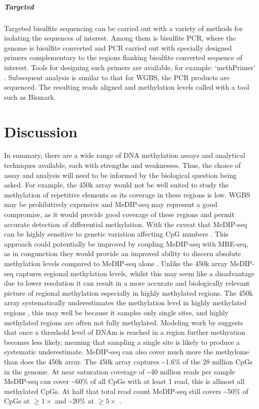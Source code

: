 \documentclass[
]{book}
\begin{document}
\hypertarget{targeted}{%
\subparagraph{Targeted}\label{targeted}}

Targeted bisulfite sequencing can be carried out with a variety of methods for isolating the sequences of interest. Among them is bisulfite PCR, where the genome is bisulfite converted and PCR carried out with specially designed primers complementary to the regions flanking bisulfite converted sequence of interest. Tools for designing such primers are available, for example: `methPrimer' \citep{Li2002}. Subsequent analysis is similar to that for WGBS, the PCR products are sequenced. The resulting reads aligned and methylation levels called with a tool such as Bismark.

\hypertarget{discussion}{%
\section{Discussion}\label{discussion}}

In summary, there are a wide range of DNA methylation assays and analytical techniques available, each with strengths and weaknesses. Thus, the choice of assay and analysis will need to be informed by the biological question being asked. For example, the 450k array would not be well suited to study the methylation of repetitive elements as its coverage in these regions is low. WGBS may be prohibitively expensive and MeDIP-seq may represent a good compromise, as it would provide good coverage of these regions and permit accurate detection of differential methylation. With the caveat that MeDIP-seq can be highly sensitive to genetic variation affecting CpG numbers \citep{Okitsu2015a}. This approach could potentially be improved by coupling MeDIP-seq with MRE-seq, as in congunction they would provide an improved ability to discern absolute methylation levels compared to MeDIP-seq alone \citep[\citet{Bock2010}]{Clark2012}. Unlike the 450k array MeDIP-seq captures regional methylation levels, whilst this may seem like a disadvantage due to lower resolution it can result in a more accurate and biologically relevant picture of regional methylation especially in highly methylated regions. The 450k array systematically underestimates the methylation level in highly methylated regions \citep{Clark2012}, this may well be because it samples only single sites, and highly methylated regions are often not fully methylated. Modeling work by \citet{Affinito2016} suggests that once a threshold level of DNAm is reached in a region further methyation becomes less likely, meaning that sampling a single site is likely to produce a systematic underestimate. MeDIP-seq can also cover much more the methylome than does the 450k array. The 450k array captures \textasciitilde1.6\% of the 28 million CpGs in the genome. At near saturation coverage of \textasciitilde40 million reads per sample MeDIP-seq can cover \textasciitilde60\% of all CpGs with at least 1 read, this is allmost all methylated CpGs. At half that total read count MeDIP-seq still covers \textasciitilde50\% of CpGs at \(\ge1\times\) and \textasciitilde20\% at \(\ge5\times\) \citep{Taiwo2012}.
\end{document}
